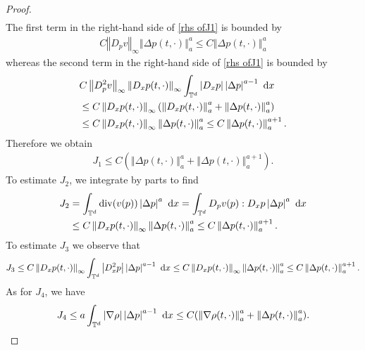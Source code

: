 \documentclass[11pt,reqno]{amsart}
\numberwithin{equation}{section}
\def\dd{{\rm d}}
\begin{document}
\begin{proof}
\begin{align}
\end{align}
The first term in the right-hand side of \eqref{rhs ofJ1} is bounded by 
\begin{align*}
C\left\Vert D_{p}v\right\Vert_{\infty}\left\Vert \Delta p(t,\cdot)\right\Vert_{a}^{a}\leq C\left\Vert \Delta p(t,\cdot)\right\Vert_{a}^{a} 
\end{align*}
whereas the second term in the right-hand side of \eqref{rhs ofJ1} is bounded by 
\begin{align*}
&C\left\Vert D_{p}^{2}v\right\Vert_{\infty}\left\Vert D_{x}p(t,\cdot)\right\Vert_{\infty}\int_{\mathbb{T}^{d}} \left\vert D_{x}p\right\vert\left\vert \Delta p\right\vert^{a-1}\ \dd x \\
&\leq C\left\Vert D
_{x}p(t,\cdot)\right\Vert_{\infty}\left(\left\Vert D_{x}p(t,\cdot)\right\Vert_{a}^{a}+\left\Vert \Delta p(t,\cdot)\right\Vert_{a}^{a}  \right)\\
&\leq C\left\Vert D_{x}p(t,\cdot)\right\Vert_{\infty}\left\Vert \Delta p(t,\cdot)\right\Vert_{a}^{a}  \leq C\left\Vert \Delta p(t,\cdot)\right\Vert_{a}^{a+1}.          
\end{align*}
Therefore we obtain
\begin{align}
J_{1}\leq C(\left\Vert \Delta p(t,\cdot)\right\Vert_{a}^{a}+\left\Vert \Delta p(t,\cdot)\right\Vert_{a}^{a+1}). \label{est J1}   
\end{align}
To estimate $J_{2}$, we integrate by parts to find 
\begin{align}
J_{2}&=\int_{\mathbb{T}^{d}} \mathrm{div}(v(p))\left\vert \Delta p\right\vert^{a}\ \dd x=\int_{\mathbb{T}^{d}} D_{p}v(p):D_{x}p\left\vert \Delta p\right\vert^{a}\ \dd x \notag\\
&\leq C\left\Vert D_{x}p(t,\cdot)\right\Vert_{\infty} \left\Vert \Delta p(t,\cdot)\right\Vert_{a}^{a}   \leq C\left\Vert \Delta p(t,\cdot)\right\Vert_{a}^{a+1}.
\label{J2 est}     
\end{align}
To estimate $J_{3}$ we observe that 
\begin{align}
J_{3}\leq C\left\Vert D_{x}p(t,\cdot)\right\Vert_{\infty} \int_{\mathbb{T}^{d}}\left\vert D_{x}^{2}p\right\vert \left\vert \Delta p\right\vert^{a-1}\ \dd x\leq C\left\Vert D_{x}p(t,\cdot)\right\Vert_{\infty}\left\Vert \Delta p(t,\cdot)\right\Vert_{a}^{a}\leq C\left\Vert \Delta p(t,\cdot)\right\Vert_{a}^{a+1}.         
\label{J3 est}     
\end{align}
As for $J_{4}$, we have 
\begin{align}
J_{4}\leq a\int_{\mathbb{T}^{d}}\left\vert \nabla \rho\right\vert\left\vert \Delta p\right\vert^{a-1}\ \dd x\leq  C(\left\Vert \nabla \rho(t,\cdot)\right\Vert_{a}^{a}+\left\Vert \Delta p(t,\cdot)\right\Vert_{a}^{a}).  \label{J4 est}     

\end{align}
\end{proof}
\end{document}
